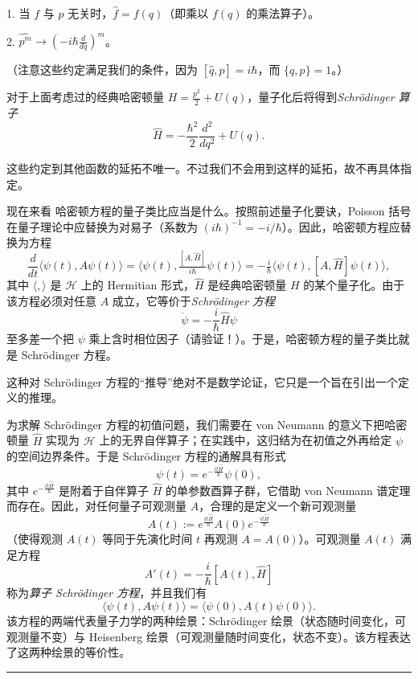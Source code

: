 1. 当 $f$ 与 $p$ 无关时，$\widehat f=f(q)$（即乘以 $f(q)$ 的乘法算子）。

2. $\widehat{p^m}\to (-i\hbar \frac{d}{dq})^m$。

（注意这些约定满足我们的条件，因为 $[\widehat q,\widehat p]=i\hbar$，而 $\lbrace{q,p\rbrace}=1$。）

\begin{example} 对于上面考虑过的经典哈密顿量 $H=\frac{p^2}{2}+U(q)$，量子化后将得到\emph{Schr\"odinger 算子}
$$
\widehat H=-\frac{\hbar^2}{2}\frac{d^2}{dq^2}+U(q).
$$
\end{example}

\begin{remark} 这些约定到其他函数的延拓不唯一。不过我们不会用到这样的延拓，故不再具体指定。
\end{remark}

现在来看 哈密顿方程的量子类比应当是什么。按照前述量子化要诀，Poisson 括号在量子理论中应替换为对易子（系数为 $(i\hbar)^{-1}=-i/\hbar$）。因此，哈密顿方程应替换为方程
$$
\frac{d}{dt}\langle\psi(t),A\psi(t)\rangle=\langle\psi(t),\tfrac{[A,\widehat
  H]}{i\hbar}\psi(t)\rangle=
-\tfrac{i}{\hbar}
\langle\psi(t),[A,\widehat H]\psi(t)\rangle,
$$
其中 $\langle,\rangle$ 是 ${\mathcal H}$ 上的 Hermitian 形式，$\widehat H$ 是经典哈密顿量 $H$ 的某个量子化。由于该方程必须对任意 $A$ 成立，它等价于\emph{Schr\"odinger 方程}
$$
\dot{\psi}=-\frac{i}{\hbar}\widehat H\psi
$$
至多差一个把 $\psi$ 乘上含时相位因子（请验证！）。于是，哈密顿方程的量子类比就是 Schr\"odinger 方程。

\begin{remark} 这种对 Schr\"odinger 方程的“推导”绝对不是数学论证，它只是一个旨在引出一个定义的推理。
\end{remark}

为求解 Schr\"odinger 方程的初值问题，我们需要在 von Neumann 的意义下把哈密顿量 $\widehat H$ 实现为 $\mathcal H$ 上的无界自伴算子；在实践中，这归结为在初值之外再给定 $\psi$ 的空间边界条件。于是 Schr\"odinger 方程的通解具有形式
$$
\psi(t)=e^{-\frac{it\widehat H}{\hbar}}\psi(0),
$$
其中 $e^{-\frac{it\widehat H}{\hbar}}$ 是附着于自伴算子 $\widehat H$ 的单参数酉算子群，它借助 von Neumann 谱定理而存在。因此，对任何量子可观测量 $A$，合理的是定义一个新可观测量
$$
A(t):=e^{\frac{it\widehat H}{\hbar}}A(0)e^{-\frac{it\widehat
  H}{\hbar}}
$$
（使得观测 $A(t)$ 等同于先演化时间 $t$ 再观测 $A=A(0)$）。可观测量 $A(t)$ 满足方程
$$
A'(t)=-\frac{i}{\hbar}[A(t),\widehat H]
$$
称为\emph{算子 Schr\"odinger 方程}，并且我们有
$$
\langle\psi(t),A\psi(t)\rangle=\langle\psi(0),A(t)\psi(0)\rangle.
$$
该方程的两端代表量子力学的两种绘景：Schr\"odinger 绘景（状态随时间变化，可观测量不变）与 Heisenberg 绘景（可观测量随时间变化，状态不变）。该方程表达了这两种绘景的等价性。

\bigskip
\noindent\rule{\textwidth}{0.6pt}

